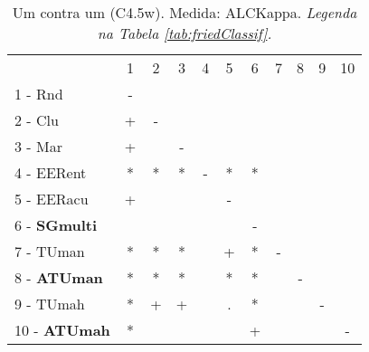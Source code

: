 \begin{table}[h]
\caption{Um contra um (C4.5w). Medida: ALCKappa. \textit{Legenda na Tabela \ref{tab:friedClassif}.}}
\begin{center}\begin{tabular}{lcc|cc|cc|cc|cc}
 			& 1 & 2 & 3 & 4 & 5 & 6 & 7 & 8 & 9 & 10\\
1 - Rnd  	& - &   &   &   &   &   &   &   &   &   \\
2 - Clu  	& + & - &   &   &   &   &   &   &   &   \\ \hline
3 - Mar  	& + &   & - &   &   &   &   &   &   &   \\
4 - EERent	& * & * & * & - & * & * &   &   &   &   \\ \hline
5 - EERacu	& + &   &   &   & - &   &   &   &   &   \\
6 - \textbf{SGmulti}	&   &   &   &   &   & - &   &   &   &   \\ \hline
7 - TUman	& * & * & * &   & + & * & - &   &   &   \\
8 - \textbf{ATUman}	& * & * & * &   & * & * &   & - &   &   \\ \hline
9 - TUmah	& * & + & + &   & . & * &   &   & - &   \\
10 - \textbf{ATUmah}	& * &   &   &   &   & + &   &   &   & - \\ \hline\end{tabular}
\label{stratsALCKappaFriedC4.5wRedux}
\end{center}
\end{table}